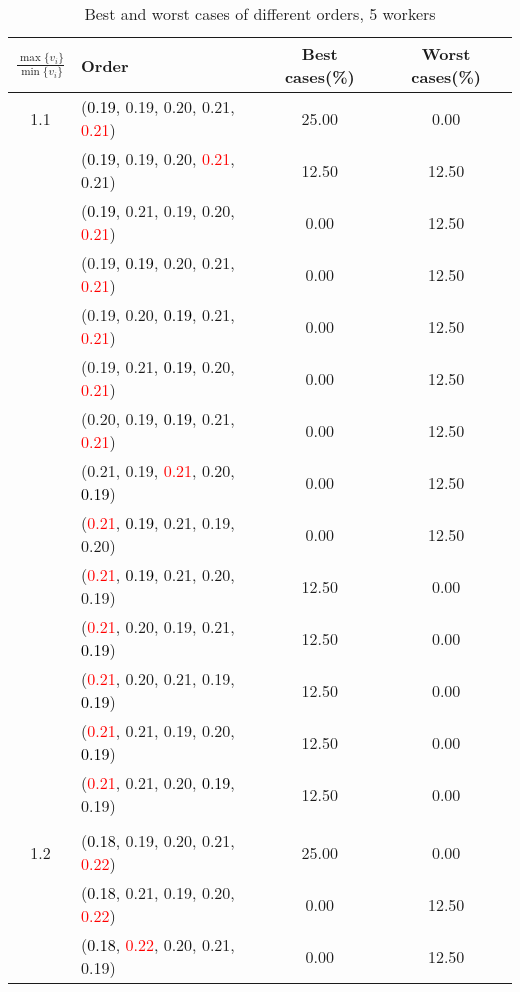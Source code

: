 \documentclass[10pt,a4paper]{report}
\begin{document}
\newpage\begin{center}
	\small
	\begin{longtable}{clcc}
		\caption{Best and worst cases of different orders, 5 workers}\\
		\toprule
		\setlength{\tabcolsep}{1mm}
		\renewcommand\baselinestretch{0.5}\selectfont
		$\frac{\max\{v_i\}}{\min\{v_i\}}$ & Order & Best cases(\%) & Worst cases(\%) \\
			\midrule		1.1			&(\textcolor{black}{0.19}, 0.19, 0.20, 0.21, \textcolor{red}{0.21})&25.00&0.00\\
			&(\textcolor{black}{0.19}, 0.19, 0.20, \textcolor{red}{0.21}, 0.21)&12.50&12.50\\
			&(\textcolor{black}{0.19}, 0.21, 0.19, 0.20, \textcolor{red}{0.21})&0.00&12.50\\
			&(0.19, \textcolor{black}{0.19}, 0.20, 0.21, \textcolor{red}{0.21})&0.00&12.50\\
			&(0.19, 0.20, \textcolor{black}{0.19}, 0.21, \textcolor{red}{0.21})&0.00&12.50\\
			&(0.19, 0.21, \textcolor{black}{0.19}, 0.20, \textcolor{red}{0.21})&0.00&12.50\\
			&(0.20, 0.19, \textcolor{black}{0.19}, 0.21, \textcolor{red}{0.21})&0.00&12.50\\
			&(0.21, 0.19, \textcolor{red}{0.21}, 0.20, \textcolor{black}{0.19})&0.00&12.50\\
			&(\textcolor{red}{0.21}, \textcolor{black}{0.19}, 0.21, 0.19, 0.20)&0.00&12.50\\
			&(\textcolor{red}{0.21}, \textcolor{black}{0.19}, 0.21, 0.20, 0.19)&12.50&0.00\\
			&(\textcolor{red}{0.21}, 0.20, 0.19, 0.21, \textcolor{black}{0.19})&12.50&0.00\\
			&(\textcolor{red}{0.21}, 0.20, 0.21, 0.19, \textcolor{black}{0.19})&12.50&0.00\\
			&(\textcolor{red}{0.21}, 0.21, 0.19, 0.20, \textcolor{black}{0.19})&12.50&0.00\\
			&(\textcolor{red}{0.21}, 0.21, 0.20, \textcolor{black}{0.19}, 0.19)&12.50&0.00\\
		&&&\\
		1.2			&(\textcolor{black}{0.18}, 0.19, 0.20, 0.21, \textcolor{red}{0.22})&25.00&0.00\\
			&(\textcolor{black}{0.18}, 0.21, 0.19, 0.20, \textcolor{red}{0.22})&0.00&12.50\\
			&(\textcolor{black}{0.18}, \textcolor{red}{0.22}, 0.20, 0.21, 0.19)&0.00&12.50\\

\end{longtable}
\end{center}
\end{document}
